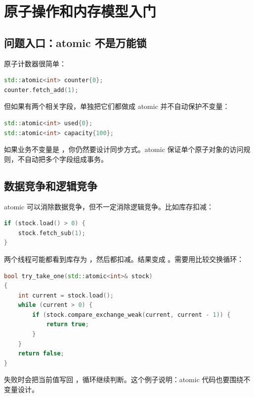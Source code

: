 \chapter{原子操作和内存模型入门}

\section{问题入口：atomic 不是万能锁}

原子计数器很简单：

\begin{lstlisting}[language=C++,caption={原子计数器}]
std::atomic<int> counter{0};
counter.fetch_add(1);
\end{lstlisting}

但如果有两个相关字段，单独把它们都做成 atomic 并不自动保护不变量：

\begin{lstlisting}[language=C++,caption={多个 atomic 仍可能不一致}]
std::atomic<int> used{0};
std::atomic<int> capacity{100};
\end{lstlisting}

如果业务不变量是 ，你仍然要设计同步方式。atomic 保证单个原子对象的访问规则，不自动把多个字段组成事务。

\section{数据竞争和逻辑竞争}

atomic 可以消除数据竞争，但不一定消除逻辑竞争。比如库存扣减：

\begin{lstlisting}[language=C++,caption={检查再扣减不是一个原子事务}]
if (stock.load() > 0) {
    stock.fetch_sub(1);
}
\end{lstlisting}

两个线程可能都看到库存为 ，然后都扣减。结果变成 。需要用比较交换循环：

\begin{lstlisting}[language=C++,caption={用比较交换做条件更新}]
bool try_take_one(std::atomic<int>& stock)
{
    int current = stock.load();
    while (current > 0) {
        if (stock.compare_exchange_weak(current, current - 1)) {
            return true;
        }
    }
    return false;
}
\end{lstlisting}

 失败时会把当前值写回 ，循环继续判断。这个例子说明：atomic 代码也要围绕不变量设计。

